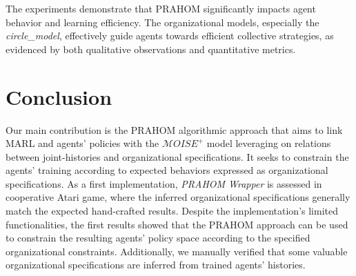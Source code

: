 \documentclass[runningheads]{llncs}
\theoremstyle{freethm}
\theoremstyle{proofoutline}
\newcounter{relation}
\newcounter{proof}
\begin{document}
The experiments demonstrate that PRAHOM significantly impacts agent behavior and learning efficiency. The organizational models, especially the \textit{circle\_model}, effectively guide agents towards efficient collective strategies, as evidenced by both qualitative observations and quantitative metrics.


\section{Conclusion}






Our main contribution is the PRAHOM algorithmic approach that aims to link MARL and agents' policies with the $\mathcal{M}OISE^+$ model leveraging on relations between joint-histories and organizational specifications. It seeks to constrain the agents' training according to expected behaviors expressed as organizational specifications.
As a first implementation, \emph{PRAHOM Wrapper} is assessed in cooperative Atari game, where the inferred organizational specifications generally match the expected hand-crafted results.
Despite the implementation's limited functionalities, the first results showed that the PRAHOM approach can be used to constrain the resulting agents' policy space according to the specified organizational constraints. Additionally, we manually verified that some valuable organizational specifications are inferred from trained agents' histories.
\end{document}

